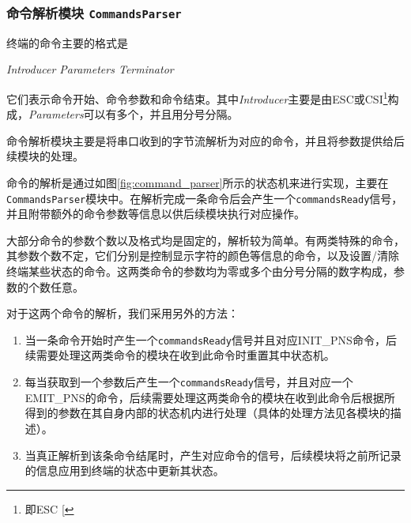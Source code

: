 \subsubsection{命令解析模块 \texttt{CommandsParser}}
终端的命令主要的格式是

\begin{center}
	\textit{Introducer Parameters Terminator}
\end{center}

它们表示命令开始、命令参数和命令结束。其中\textit{Introducer}主要是由ESC或CSI\footnote{即ESC [}构成，\textit{Parameters}可以有多个，并且用分号分隔。

命令解析模块主要是将串口收到的字节流解析为对应的命令，并且将参数提供给后续模块的处理。

命令的解析是通过如图\ref{fig:command_parser}所示的状态机来进行实现，主要在\texttt{CommandsParser}模块中。在解析完成一条命令后会产生一个\texttt{commandsReady}信号，并且附带额外的命令参数等信息以供后续模块执行对应操作。

大部分命令的参数个数以及格式均是固定的，解析较为简单。有两类特殊的命令，其参数个数不定，它们分别是控制显示字符的颜色等信息的命令，以及设置/清除终端某些状态的命令。这两类命令的参数均为零或多个由分号分隔的数字构成，参数的个数任意。

对于这两个命令的解析，我们采用另外的方法：

\begin{enumerate}
	\item 当一条命令开始时产生一个\texttt{commandsReady}信号并且对应INIT\_PNS命令，后续需要处理这两类命令的模块在收到此命令时重置其中状态机。
	\item 每当获取到一个参数后产生一个\texttt{commandsReady}信号，并且对应一个EMIT\_PNS的命令，后续需要处理这两类命令的模块在收到此命令后根据所得到的参数在其自身内部的状态机内进行处理（具体的处理方法见各模块的描述）。
	\item 当真正解析到该条命令结尾时，产生对应命令的信号，后续模块将之前所记录的信息应用到终端的状态中更新其状态。
\end{enumerate}

